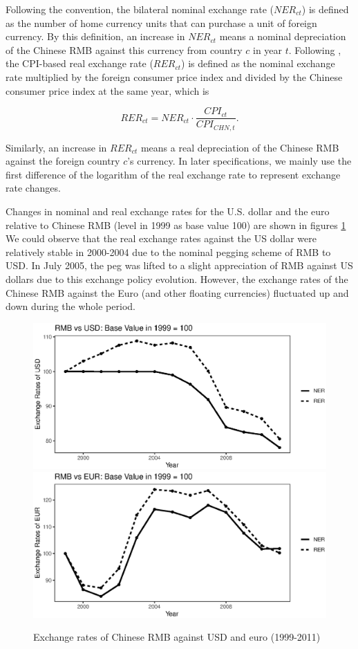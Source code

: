 \documentclass[12pt]{article}
\begin{document}
Following the convention, the bilateral nominal exchange rate ($NER_{ct}$) is defined as the number of home currency units that can purchase a unit of foreign currency. By this definition, an increase in $NER_{ct}$ means a nominal depreciation of the Chinese RMB against this currency from country $c$ in year $t$. Following \cite{lmx2015}, the CPI-based real exchange rate ($RER_{ct}$) is defined as the nominal exchange rate multiplied by the foreign consumer price index and divided by the Chinese consumer price index at the same year, which is

$$
RER_{ct}=NER_{ct} \cdot \frac{CPI_{ct}}{CPI_{CHN,t}}.
$$

Similarly, an increase in $RER_{ct}$ means a real depreciation of the Chinese RMB against the foreign country $c$'s currency. In later specifications, we mainly use the first difference of the logarithm of the real exchange rate to represent exchange rate changes.

Changes in nominal and real exchange rates for the U.S. dollar and the euro relative to Chinese RMB (level in 1999 as base value 100) are shown in figures \ref{fig.ER} We could observe that the real exchange rates against the US dollar were relatively stable in 2000-2004 due to the nominal pegging scheme of RMB to USD. In July 2005, the peg was lifted to a slight appreciation of RMB against US dollars due to this exchange policy evolution. However, the exchange rates of the Chinese RMB against the Euro (and other floating currencies) fluctuated up and down during the whole period. 

\begin{figure}[htbp]
	\centering
	\includegraphics[width=1\textwidth]{R/USD.eps}
	\includegraphics[width=1\textwidth]{R/EUR.eps}
	\caption{Exchange rates of Chinese RMB against USD and euro (1999-2011)}
	\label{fig.ER}
\end{figure}
\end{document}
